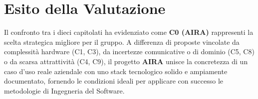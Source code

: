 \section{Esito della Valutazione}
Il confronto tra i dieci capitolati ha evidenziato come \textbf{C0 (AIRA)} rappresenti la scelta strategica migliore per il gruppo. A differenza di proposte vincolate da complessità hardware (C1, C3), da incertezze comunicative o di dominio (C5, C8) o da scarsa attrattività (C4, C9), il progetto \textbf{AIRA} unisce la concretezza di un caso d'uso reale aziendale con uno stack tecnologico solido e ampiamente documentato, fornendo le condizioni ideali per applicare con successo le metodologie di Ingegneria del Software.
